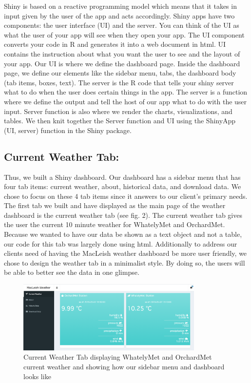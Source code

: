 \documentclass[10pt,letterpaper]{article}
\begin{document}
Shiny is based on a reactive programming model which means that it takes
in input given by the user of the app and acts accordingly. Shiny apps
have two components: the user interface (UI) and the server. You can
think of the UI as what the user of your app will see when they open
your app. The UI component converts your code in R and generates it into
a web document in html. UI contains the instruction about what you want
the user to see and the layout of your app. Our UI is where we define
the dashboard page. Inside the dashboard page, we define our elements
like the sidebar menu, tabs, the dashboard body (tab items, boxes,
text). The server is the R code that tells your shiny server what to do
when the user does certain things in the app. The server is a function
where we define the output and tell the host of our app what to do with
the user input. Server function is also where we render the charts,
visualizations, and tables. We then knit together the Server function
and UI using the ShinyApp (UI, server) function in the Shiny package.

\subsection{Current Weather Tab:}\label{current-weather-tab}

Thus, we built a Shiny dashboard. Our dashboard has a sidebar menu that
has four tab items: current weather, about, historical data, and
download data. We chose to focus on these 4 tab items since it answers
to our client's primary needs. The first tab we built and have displayed
as the main page of the weather dashboard is the current weather tab
(see fig. 2). The current weather tab gives the user the current 10
minute weather for WhatelyMet and OrchardMet. Because we wanted to have
our data be shown as a text object and not a table, our code for this
tab was largely done using html. Additionally to address our clients
need of having the MacLeish weather dashboard be more user friendly, we
chose to design the weather tab in a minimalist style. By doing so, the
users will be able to better see the data in one glimpse.

\begin{figure}
\includegraphics[width=350px]{weather} \caption{Current Weather Tab displaying WhatelyMet and OrchardMet current weather and showing how our sidebar menu and dashboard looks like}\label{fig:unnamed-chunk-2}
\end{figure}
\end{document}
